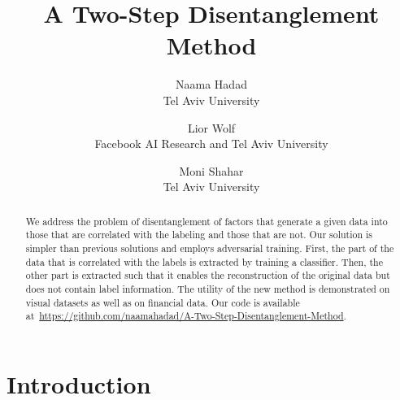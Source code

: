\documentclass[10pt,twocolumn,letterpaper]{article}
\begin{document}
\title{A Two-Step Disentanglement Method}

\author{Naama Hadad\\
Tel Aviv University\\
\and
Lior Wolf\\
Facebook AI Research and Tel Aviv University\\
\and
Moni Shahar\\
Tel Aviv University
}

\maketitle

\begin{abstract}
We address the problem of disentanglement of factors that generate a given data into those that are correlated with the labeling and those that are not. Our solution is simpler than previous solutions and employs adversarial training. First, the part of the data that is correlated with the labels is extracted by training a classifier. Then, the other part is extracted such that it enables the reconstruction of the original data but does not contain label information. The utility of the new method is demonstrated on visual datasets as well as on financial data. Our code is available at~\url{https://github.com/naamahadad/A-Two-Step-Disentanglement-Method}.%
\end{abstract}

\section{Introduction}

\end{document}
